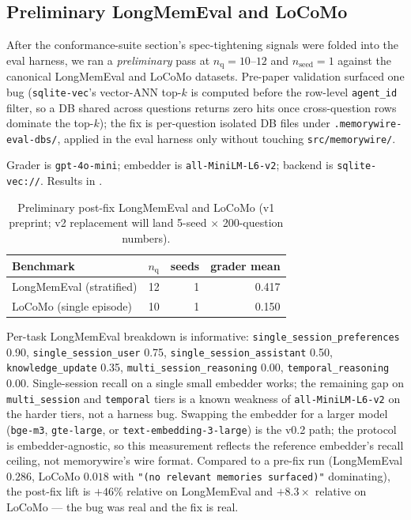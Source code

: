 \documentclass[11pt,letterpaper,twocolumn]{article}
\begin{document}
\subsection{Preliminary LongMemEval and LoCoMo}
\label{sec:eval-mem-benchmarks}

After the conformance-suite section's spec-tightening signals were folded into the eval harness, we ran a \emph{preliminary} pass at $n_{\text{q}} = 10$--$12$ and $n_{\text{seed}} = 1$ against the canonical LongMemEval \cite{wu2024longmemeval} and LoCoMo \cite{maharana2024locomo} datasets. Pre-paper validation surfaced one bug (\texttt{sqlite-vec}'s vector-ANN top-$k$ is computed before the row-level \texttt{agent\_id} filter, so a DB shared across questions returns zero hits once cross-question rows dominate the top-$k$); the fix is per-question isolated DB files under \texttt{.memorywire-eval-dbs/}, applied in the eval harness only without touching \texttt{src/memorywire/}.

Grader is \texttt{gpt-4o-mini}; embedder is \texttt{all-MiniLM-L6-v2}; backend is \texttt{sqlite-vec://}. Results in .

\begin{table}[t]
\centering
\caption{Preliminary post-fix LongMemEval and LoCoMo (v1 preprint; v2 replacement will land 5-seed $\times$ 200-question numbers).}
\label{tab:mem-benchmarks}
\begin{tabular}{lrrr}
\toprule
Benchmark & $n_{\text{q}}$ & seeds & grader mean \\
\midrule
LongMemEval (stratified) & 12 & 1 & 0.417 \\
LoCoMo (single episode)  & 10 & 1 & 0.150 \\
\bottomrule
\end{tabular}
\end{table}

Per-task LongMemEval breakdown is informative: \texttt{single\_session\_preferences} 0.90, \texttt{single\_session\_user} 0.75, \texttt{single\_session\_assistant} 0.50, \texttt{knowledge\_update} 0.35, \texttt{multi\_session\_reasoning} 0.00, \texttt{temporal\_reasoning} 0.00. Single-session recall on a single small embedder works; the remaining gap on \texttt{multi\_session} and \texttt{temporal} tiers is a known weakness of \texttt{all-MiniLM-L6-v2} on the harder tiers, not a harness bug. Swapping the embedder for a larger model (\texttt{bge-m3}, \texttt{gte-large}, or \texttt{text-embedding-3-large}) is the v0.2 path; the protocol is embedder-agnostic, so this measurement reflects the reference embedder's recall ceiling, not memorywire's wire format. Compared to a pre-fix run (LongMemEval $0.286$, LoCoMo $0.018$ with \texttt{"(no relevant memories surfaced)"} dominating), the post-fix lift is $+46\%$ relative on LongMemEval and $+8.3\times$ relative on LoCoMo --- the bug was real and the fix is real.
\end{document}
